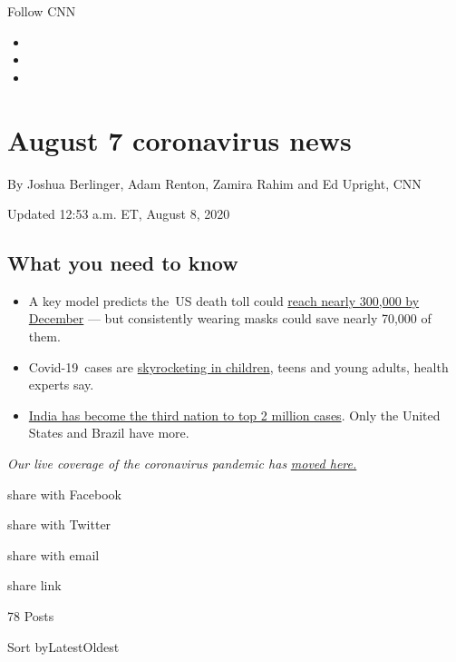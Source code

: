 Follow CNN

\begin{itemize}
\item
\item
\item
\end{itemize}

\hypertarget{august-7-coronavirus-news}{%
\section{August 7 coronavirus news}\label{august-7-coronavirus-news}}

By Joshua Berlinger, Adam Renton, Zamira Rahim and Ed Upright, CNN

Updated 12:53 a.m. ET, August 8, 2020

\hypertarget{what-you-need-to-know}{%
\subsection{What you need to know}\label{what-you-need-to-know}}

\begin{itemize}
\tightlist
\item
  A key model predicts the~US death toll could
  \href{https://www.cnn.com/2020/08/07/health/us-coronavirus-friday/index.html}{reach
  nearly 300,000 by December} --- but consistently wearing masks could
  save nearly 70,000 of them.
\item
  Covid-19~cases are
  \href{https://www.cnn.com/2020/08/07/health/us-coronavirus-friday/index.html}{skyrocketing
  in children}, teens and young adults, health experts say.
\item
  \href{https://www.cnn.com/2020/08/07/asia/india-coronavirus-two-million-intl-hnk/index.html}{India
  has become the third nation to top 2 million cases}. Only the United
  States and Brazil have more.
\end{itemize}

\emph{Our live coverage of the coronavirus pandemic has}
\href{https://www.cnn.com/world/live-news/coronavirus-pandemic-08-08-20-intl/index.html}{\emph{moved
here.}}

share with Facebook

share with Twitter

share with email

share link

78 Posts

Sort byLatestOldest

